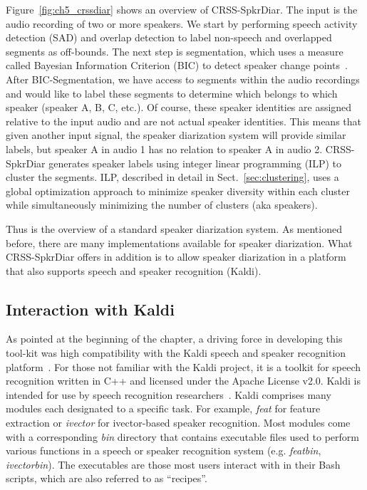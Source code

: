Figure~\ref{fig:ch5_crssdiar} shows an overview of CRSS-SpkrDiar. 
The input is the audio recording of two or more speakers. 
We start by performing speech activity detection (SAD) and overlap detection to label non-speech and overlapped segments as off-bounds. 
The next step is segmentation, which uses a measure called Bayesian Information Criterion (BIC) to detect speaker change points~\cite{chen1998BIC}. 
After BIC-Segmentation, we have access to segments within the audio recordings and would like to label these segments to determine which belongs to which speaker (speaker A, B, C, etc.). 
Of course, these speaker identities are assigned relative to the input audio and are not actual speaker identities. 
This means that given another input signal, the speaker diarization system will provide similar labels, but speaker A in audio 1 has no relation to speaker A in audio 2. 
CRSS-SpkrDiar generates speaker labels using integer linear programming (ILP) to cluster the segments. 
ILP, described in detail in Sect.~\ref{sec:clustering}, uses a global optimization approach to minimize speaker diversity within each cluster while simultaneously minimizing the number of clusters (aka speakers). 

Thus is the overview of a standard speaker diarization system. 
As mentioned before, there are many implementations available for speaker diarization. 
What CRSS-SpkrDiar offers in addition is to allow speaker diarization in a platform that also supports speech and speaker recognition (Kaldi). 


\subsection{Interaction with Kaldi}
\label{ssec:crssdiar_and_kaldi}

As pointed at the beginning of the chapter, a driving force in developing this tool-kit was high compatibility with the Kaldi speech and speaker recognition platform~\cite{kaldi}. 
For those not familiar with the Kaldi project, it is a toolkit for speech recognition written in C++ and licensed under the Apache License v2.0. Kaldi is intended for use by speech recognition researchers~\cite{kaldi}. 
Kaldi comprises many modules each designated to a specific task. For example, {\it feat} for feature extraction or {\it ivector} for ivector-based speaker recognition. 
Most modules come with a corresponding {\it bin} directory  that contains executable files used to perform various functions in a speech or speaker recognition system (e.g. {\it featbin}, {\it ivectorbin}). 
The executables are those most users interact with in their Bash scripts, which are also referred to as ``recipes''. 

